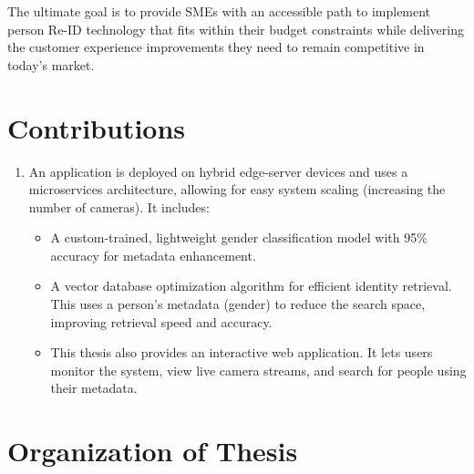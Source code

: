 \documentclass[../main.tex]{subfiles}
\begin{document}
The ultimate goal is to provide SMEs with an accessible path to implement person Re-ID technology that fits within their budget constraints while delivering the customer experience improvements they need to remain competitive in today's market.


\section{Contributions}
\label{sec:contribution}

\begin{enumerate}
    \item An application is deployed on hybrid edge-server devices and uses a microservices architecture, allowing for easy system scaling (increasing the number of cameras). It includes:
    \begin{itemize}
        \item A custom-trained, lightweight gender classification model with 95\% accuracy for metadata enhancement.
        \item A vector database optimization algorithm for efficient identity retrieval. This uses a person's metadata (gender) to reduce the search space, improving retrieval speed and accuracy.
    \item This thesis also provides an interactive web application. It lets users monitor the system, view live camera streams, and search for people using their metadata.
\end{itemize} 
\end{enumerate}

\section{Organization of Thesis}
\label{sec:organize}
\end{document}
